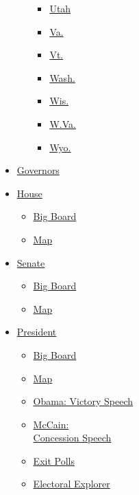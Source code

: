 \begin{itemize}
\begin{itemize}
\begin{itemize}
    \item
      \href{utah.html}{Utah}
    \item
      \href{virginia.html}{Va.}
    \item
      \href{vermont.html}{Vt.}
    \item
      \href{washington.html}{Wash.}
    \item
      \href{wisconsin.html}{Wis.}
    \item
      \href{west-virginia.html}{W.Va.}
    \item
      \href{wyoming.html}{Wyo.}
    \end{itemize}
  \end{itemize}
\item
  \href{../governor/votes.html}{Governors}
\item
  \href{../house/votes.html}{House}

  \begin{itemize}
  \tightlist
  \item
    \href{../house/votes.html}{Big Board}
  \item
    \href{../house/map.html}{Map}
  \end{itemize}
\item
  \href{../senate/votes.html}{Senate}

  \begin{itemize}
  \tightlist
  \item
    \href{../senate/votes.html}{Big Board}
  \item
    \href{../senate/map.html}{Map}
  \end{itemize}
\item
  \href{../president/votes.html}{President}

  \begin{itemize}
  \tightlist
  \item
    \href{../president/votes.html}{Big Board}
  \item
    \href{../president/map.html}{Map}
  \item
    \href{../president/speeches/obama-victory-speech.html}{Obama:
    Victory Speech}
  \item
    \href{../president/speeches/mccain-concession-speech.html}{McCain:\\
    Concession Speech}
  \item
    \href{../president/exit-polls.html}{Exit Polls}
  \item
    \href{../president/explorer.html}{Electoral Explorer}
  \end{itemize}
\end{itemize}


